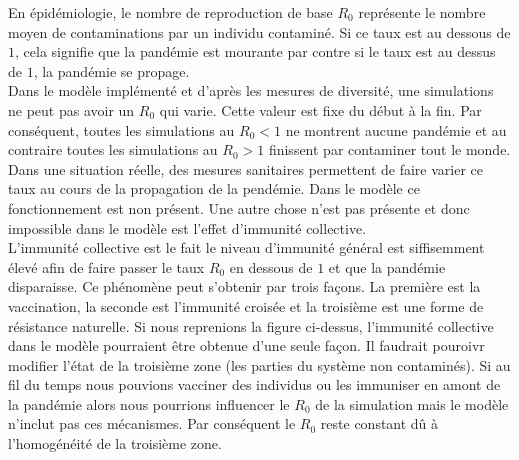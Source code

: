En épidémiologie, le nombre de reproduction de base $R_0$ représente le nombre moyen de contaminations par un individu contaminé. Si ce taux est au dessous de $1$, cela signifie que la pandémie est mourante par contre si le taux est au dessus de $1$, la pandémie se propage.\\

Dans le modèle implémenté et d'après les mesures de diversité, une simulations ne peut pas avoir un $R_0$ qui varie. Cette valeur est fixe du début à la fin. Par conséquent, toutes les simulations au $R_0 < 1$ ne montrent aucune pandémie et au contraire toutes les simulations au $R_0 > 1$ finissent par contaminer tout le monde. Dans une situation réelle, des mesures sanitaires permettent de faire varier ce taux au cours de la propagation de la pendémie. Dans le modèle ce fonctionnement est non présent. Une autre chose n'est pas présente et donc impossible dans le modèle est l'effet d'immunité collective.\\

L'immunité collective est le fait le niveau d'immunité général est siffisemment élevé afin de faire passer le taux $R_0$ en dessous de $1$ et que la pandémie disparaisse. Ce phénomène peut s'obtenir par trois façons. La première est la vaccination, la seconde est l'immunité croisée et la troisième est une forme de résistance naturelle. Si nous reprenions la figure ci-dessus, l'immunité collective dans le modèle pourraient être obtenue d'une seule façon. Il faudrait pouroivr modifier l'état de la troisième zone (les parties du système non contaminés). Si au fil du temps nous pouvions vacciner des individus ou les immuniser en amont de la pandémie alors nous pourrions influencer le $R_0$ de la simulation mais le modèle n'inclut pas ces mécanismes. Par conséquent le $R_0$ reste constant dû à l'homogénéité de la troisième zone.


